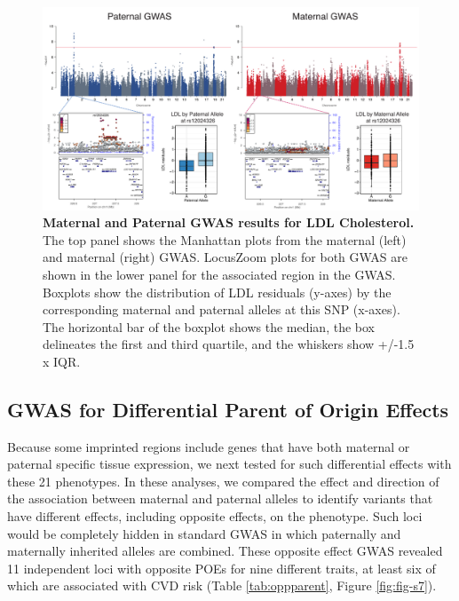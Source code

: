 \begin{figure}[!htb]
\centering \includegraphics[width=6in]{img/ch02/fig-02-ldl_matpatgwas.pdf}
\caption[Maternal and Paternal GWAS results for LDL Cholesterol.]{\textbf{Maternal and Paternal GWAS results for LDL Cholesterol.}  The top panel shows the Manhattan plots from the maternal (left) and maternal (right) GWAS. LocusZoom plots for both GWAS are shown in the lower panel for the associated region in the GWAS. Boxplots show the distribution of LDL residuals (y-axes) by the corresponding maternal and paternal alleles at this SNP (x-axes). The horizontal bar of the boxplot shows the median, the box delineates the first and third quartile, and the whiskers show +/-1.5 x IQR.}
\label{fig:ldl_mpgwas}
\end{figure}


\subsection{GWAS for Differential Parent of Origin Effects}\label{GWAS for Differential Parent of Origin Effects}

Because some imprinted regions include genes that have both maternal or paternal specific tissue expression, we next tested for such differential effects with these 21 phenotypes. In these analyses, we compared the effect and direction of the association between maternal and paternal alleles to identify variants that have different effects, including opposite effects, on the phenotype. Such loci would be completely hidden in standard GWAS in which paternally and maternally inherited alleles are combined. These opposite effect GWAS revealed 11 independent loci with opposite POEs for nine different traits, at least six of which are associated with CVD risk (Table \ref{tab:oppparent}, Figure \ref{fig:fig-s7}). 


